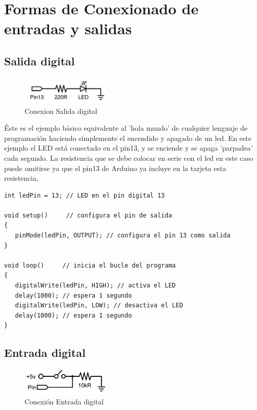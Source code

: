 \chapter{Formas de Conexionado de entradas y salidas}

\section{Salida digital}
\begin{figure}[!htp]
	\centering
	\includegraphics[width=120pt]{./Imagenes/Documentos/ArduinoNotebook_img01.png}
	\caption[Conexión Salida digital]{Conexion Salida digital}
\end{figure}

Éste es el ejemplo básico equivalente al 'hola mundo' de cualquier lenguaje de programación haciendo simplemente el encendido y apagado de un led. En este ejemplo el LED está conectado en el pin13, y se enciende y se apaga 'parpadea' cada segundo. La resistencia que se debe colocar en serie con el led en este caso puede omitirse ya que el pin13 de Arduino ya incluye en la tarjeta esta resistencia,
\begin{lstlisting}
int ledPin = 13; // LED en el pin digital 13

void setup()     // configura el pin de salida
{
   pinMode(ledPin, OUTPUT); // configura el pin 13 como salida
}

void loop()     // inicia el bucle del programa
{
   digitalWrite(ledPin, HIGH); // activa el LED
   delay(1000); // espera 1 segundo
   digitalWrite(ledPin, LOW); // desactiva el LED
   delay(1000); // espera 1 segundo
}
\end{lstlisting}
\newpage{}
\section{Entrada digital}
\begin{figure}[!htp]
	\centering
	\includegraphics[width=120pt]{./Imagenes/Documentos/ArduinoNotebook_img02.png}
	\caption[Conexión Entrada digital]{Conexión Entrada digital}
\end{figure}


